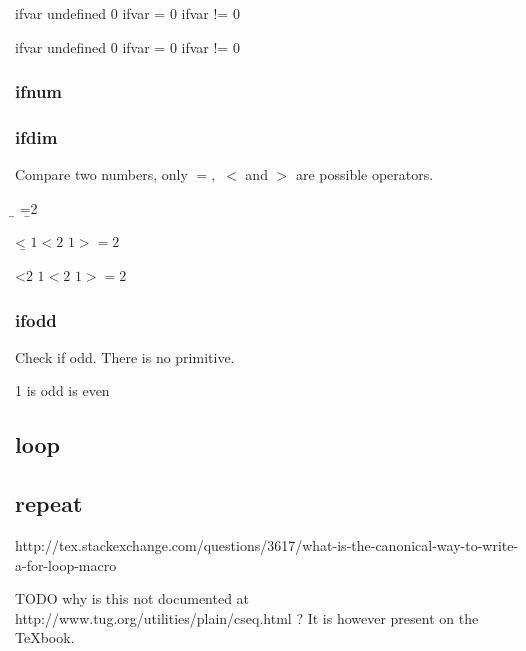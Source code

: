       \def\ifvar{0}

      \ifx\ifvar\undefined
        ifvar undefined
      \else
        \if\ifvar0
          ifvar = 0
        \else
          ifvar != 0
        \fi
      \fi

      \def\ifvar{1}

      \ifx\ifvar\undefined
        ifvar undefined
      \else
        \if\ifvar0
          ifvar = 0
        \else
          ifvar != 0
        \fi
      \fi

    \subsubsection{ifnum}

    \subsubsection{ifdim}

      Compare two numbers, only $=,$ $<$ and $>$ are possible operators.

      \newcount\a
      \newcount\b
      \b=2

      \ifnum\a<\b
        $1 < 2$
      \else
        $1 >= 2$
      \fi

      \ifnum\a<2
        $1 < 2$
      \else
        $1 >= 2$
      \fi

    \subsubsection{ifodd}

      Check if odd. There is no  primitive.

        1 is odd
       is even
      \fi

  \subsection{loop}

  \subsection{repeat}

    http://tex.stackexchange.com/questions/3617/what-is-the-canonical-way-to-write-a-for-loop-macro

    TODO why is this not documented at http://www.tug.org/utilities/plain/cseq.html ? It is however present on the TeXbook.

